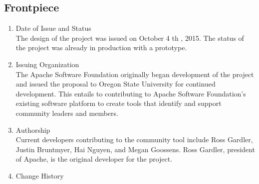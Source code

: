 \documentclass[draftclsnofoot,10pt,onecolumn]{IEEEtran} %
\begin{document}
\subsection{Frontpiece}
	\begin{enumerate}
	
		\item Date of Issue and Status \\
		The design of the project was issued on October 4 th , 2015. The status of the project was already in production with a
		prototype.\\
		
		\item Issuing Organization \\
		The Apache Software Foundation originally began development of the project and issued the proposal to Oregon
		State University for continued development. This entails to contributing to Apache Software Foundation’s existing
		software platform to create tools that identify and support community leaders and members.\\
		
		\item Authorship \\
		Current developers contributing to the community tool include Ross Gardler, Justin Bruntmyer, Hai Nguyen, and
		Megan Goossens. Ross Gardler, president of Apache, is the original developer for the project.\\
		
		\item Change History
		
	\end{enumerate}
	
\end{document}
